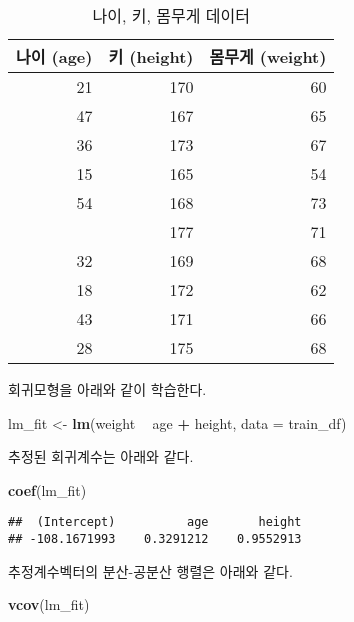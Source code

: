 \documentclass[]{book}
\newenvironment{Shaded}{\begin{snugshade}}{\end{snugshade}}
\newcommand{\DataTypeTok}[1]{\textcolor[rgb]{0.13,0.29,0.53}{#1}}
\newcommand{\KeywordTok}[1]{\textcolor[rgb]{0.13,0.29,0.53}{\textbf{#1}}}
\newcommand{\NormalTok}[1]{#1}
\newcommand{\OperatorTok}[1]{\textcolor[rgb]{0.81,0.36,0.00}{\textbf{#1}}}
\newcommand{\StringTok}[1]{\textcolor[rgb]{0.31,0.60,0.02}{#1}}
\begin{document}
\begin{table}[t]

\caption{\label{tab:regression-age-height-weight-data}나이, 키, 몸무게 데이터}
\centering
\begin{tabular}{rrr}
\toprule
나이 (age) & 키 (height) & 몸무게 (weight)\\
\midrule
21 & 170 & 60\\
47 & 167 & 65\\
36 & 173 & 67\\
15 & 165 & 54\\
54 & 168 & 73\\
\addlinespace
25 & 177 & 71\\
32 & 169 & 68\\
18 & 172 & 62\\
43 & 171 & 66\\
28 & 175 & 68\\
\bottomrule
\end{tabular}
\end{table}

회귀모형을 아래와 같이 학습한다.

\begin{Shaded}
\begin{Highlighting}[]
\NormalTok{lm_fit <-}\StringTok{ }\KeywordTok{lm}\NormalTok{(weight }\OperatorTok{~}\StringTok{ }\NormalTok{age }\OperatorTok{+}\StringTok{ }\NormalTok{height, }\DataTypeTok{data =}\NormalTok{ train_df)}
\end{Highlighting}
\end{Shaded}

추정된 회귀계수는 아래와 같다.

\begin{Shaded}
\begin{Highlighting}[]
\KeywordTok{coef}\NormalTok{(lm_fit)}
\end{Highlighting}
\end{Shaded}

\begin{verbatim}
##  (Intercept)          age       height 
## -108.1671993    0.3291212    0.9552913
\end{verbatim}

추정계수벡터의 분산-공분산 행렬은 아래와 같다.

\begin{Shaded}
\begin{Highlighting}[]
\KeywordTok{vcov}\NormalTok{(lm_fit)}
\end{Highlighting}
\end{Shaded}
\end{document}
